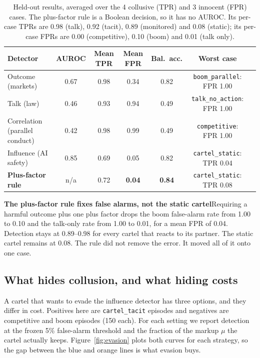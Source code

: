 \documentclass[10pt]{article}
\newcommand{\para}[1]{\textbf{#1}\hspace{0.45em}}
\begin{document}
\begin{table}[t]\centering\small
\begin{tabular}{@{}lcccccl@{}}\toprule
Detector & AUROC & Mean TPR & Mean FPR & Bal.\ acc. & Worst case\\\midrule
Outcome (markets) & 0.67 & 0.98 & 0.34 & 0.82 & \texttt{boom\_parallel}: FPR 1.00\\
Talk (law) & 0.46 & 0.93 & 0.94 & 0.49 & \texttt{talk\_no\_action}: FPR 1.00\\
Correlation (parallel conduct) & 0.42 & 0.98 & 0.99 & 0.49 & \texttt{competitive}: FPR 1.00\\
Influence (AI safety) & 0.85 & 0.69 & 0.05 & 0.82 & \texttt{cartel\_static}: TPR 0.04\\
\textbf{Plus-factor rule} & n/a & 0.72 & \textbf{0.04} & \textbf{0.84} & \texttt{cartel\_static}: TPR 0.08\\\bottomrule
\end{tabular}
\caption{Held-out results, averaged over the 4 collusive (TPR) and 3 innocent (FPR) cases. The plus-factor rule is a Boolean decision, so it has no AUROC. Its per-case TPRs are 0.98 (talk), 0.92 (tacit), 0.89 (monitored) and 0.08 (static); its per-case FPRs are 0.00 (competitive), 0.10 (boom) and 0.01 (talk only).}\label{tab:main}
\end{table}

\para{The plus-factor rule fixes false alarms, not the static cartel}Requiring a harmful outcome plus one plus factor drops the boom false-alarm rate from 1.00 to 0.10 and the talk-only rate from 1.00 to 0.01, for a mean FPR of 0.04. Detection stays at 0.89--0.98 for every cartel that reacts to its partner. The static cartel remains at 0.08. The rule did not remove the error. It moved all of it onto one case.

\subsection{What hides collusion, and what hiding costs}

A cartel that wants to evade the influence detector has three options, and they differ in cost. Positives here are \texttt{cartel\_tacit} episodes and negatives are competitive and boom episodes (150 each). For each setting we report detection at the frozen 5\% false-alarm threshold and the fraction of the markup $\mu$ the cartel actually keeps. Figure~\ref{fig:evasion} plots both curves for each strategy, so the gap between the blue and orange lines is what evasion buys.
\end{document}

